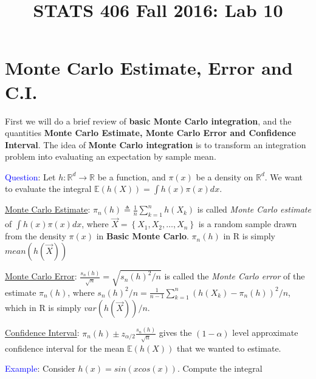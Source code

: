\documentclass[12pt]{article}
\newcommand{\E}{\mathbb{E}}
\newcommand{\R}{\mathbb{R}}
\newcommand{\set}[1]{\left\{#1\right\}}
\newcommand{\paren}[1]{\left(#1\right)}
\numberwithin{equation}{subsection}
\begin{document}
\title{\textbf{STATS 406 Fall 2016: Lab 10}}
\date{}

\maketitle

\section{Monte Carlo Estimate, Error and C.I.}

First we will do a brief review of \textbf{basic Monte Carlo integration}, and the quantities \textbf{Monte Carlo Estimate, Monte Carlo Error and Confidence Interval}. The idea of \textbf{Monte Carlo integration} is to transform an integration problem into evaluating an expectation by sample mean. \newline

\noindent
\textcolor{blue}{Question}: Let $h : \R^{d} \to \R$ be a function, and $\pi(x)$ be a density on $\R^{d}$. We want to evaluate the integral $\E\paren{h(X)} = \int h(x)\pi(x) dx$. \newline

\noindent
\underline{Monte Carlo Estimate}: $\pi_n\paren{h} \triangleq \frac{1}{n}\sum\limits_{k=1}^n{h(X_k)}$ is called \textit{Monte Carlo estimate} of $\int h(x)\pi(x) dx$, where $\vec{X} = \set{X_1, X_2, \dots, X_n}$ is a random sample drawn from the density $\pi(x)$ in \textbf{Basic Monte Carlo}. $\pi_n\paren{h}$ in R is simply $mean(h(\vec{X}))$\newline

\noindent
\underline{Monte Carlo Error}: $\frac{s_n\paren{h}}{\sqrt{n}} = \sqrt{s_n\paren{h}^2 / n}$ is called the \textit{Monte Carlo error} of the estimate $\pi_n\paren{h}$, where $s_n\paren{h}^2 / n = \frac{1}{n-1}\sum\limits_{k=1}^n\paren{h(X_k)-\pi_n(h)}^2 / n$, which in R is simply $var(h(\vec{X})) / n$. %

\noindent
\underline{Confidence Interval}: $\pi_n(h) \pm z_{\alpha/2}\frac{s_n(h)}{\sqrt{n}}$ gives the $(1-\alpha)$ level approximate confidence interval for the mean $\E\paren{h(X)}$ that we wanted to estimate. \newline

\noindent
\textcolor{blue}{Example}: Consider $h(x) = sin(xcos(x))$. Compute the integral 
\end{document}
